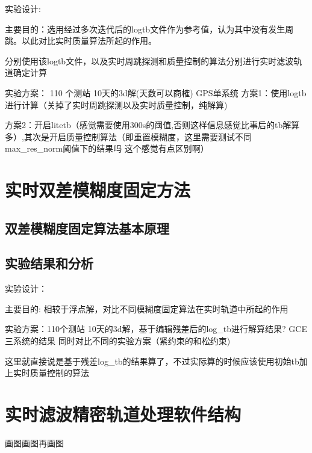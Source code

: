 实验设计:

主要目的：选用经过多次迭代后的log\underline{\space}tb文件作为参考值，认为其中没有发生周跳。以此对比实时质量算法所起的作用。

分别使用该log\underline{\space}tb文件，以及实时周跳探测和质量控制的算法分别进行实时滤波轨道确定计算

实验方案： 110 个测站 10天的3d解(天数可以商榷) GPS单系统
方案1：使用log\underline{\space}tb进行计算（关掉了实时周跳探测以及实时质量控制，纯解算)

方案2：开启litetb（感觉需要使用300s的阈值,否则这样信息感觉比事后的tb解算多）,其次是开启质量控制算法（即重置模糊度，这里需要测试不同max\_res\_norm阈值下的结果吗 这个感觉有点区别啊）

\section{实时双差模糊度固定方法}

\subsection{双差模糊度固定算法基本原理}

\subsection{实验结果和分析}

实验设计：

主要目的:
相较于浮点解，对比不同模糊度固定算法在实时轨道中所起的作用

实验方案：110个测站  10天的3d解，基于编辑残差后的log\_tb进行解算结果? GCE三系统的结果
同时对比不同的实验方案（紧约束的和松约束)

这里就直接说是基于残差log\_tb的结果算了，不过实际算的时候应该使用初始tb加上实时质量控制的算法

\section{实时滤波精密轨道处理软件结构}

画图画图再画图
